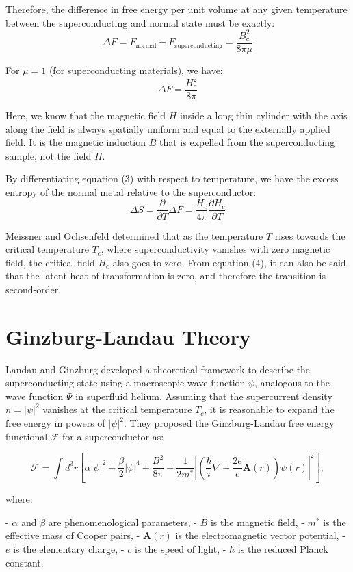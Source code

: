 \documentclass{article}
\begin{document}
Therefore, the difference in free energy per unit volume at any given temperature between the superconducting and normal state must be exactly:
\[
\Delta F = F_{\text{normal}} - F_{\text{superconducting}} = \frac{B_c^2}{8 \pi \mu}
\]

For \(\mu = 1\) (for superconducting materials), we have:
\[
\Delta F = \frac{H_c^2}{8 \pi} \tag{17}
\]

Here, we know that the magnetic field \(H\) inside a long thin cylinder with the axis along the field is always spatially uniform and equal to the externally applied field. It is the magnetic induction \(B\) that is expelled from the superconducting sample, not the field \(H\).

By differentiating equation (3) with respect to temperature, we have the excess entropy of the normal metal relative to the superconductor:
\[
\Delta S = \frac{\partial}{\partial T} \Delta F = \frac{H_c}{4 \pi} \frac{\partial H_c}{\partial T} \tag{18}
\]

Meissner and Ochsenfeld determined that as the temperature \(T\) rises towards the critical temperature \(T_c\), where superconductivity vanishes with zero magnetic field, the critical field \(H_c\) also goes to zero. From equation (4), it can also be said that the latent heat of transformation is zero, and therefore the transition is second-order.

\section{Ginzburg-Landau Theory}

Landau and Ginzburg developed a theoretical framework to describe the superconducting state using a macroscopic wave function \(\psi\), analogous to the wave function \(\Psi\) in superfluid helium. Assuming that the supercurrent density \(n = |\psi|^2\) vanishes at the critical temperature \(T_c\), it is reasonable to expand the free energy in powers of \(|\psi|^2\). They proposed the Ginzburg-Landau free energy functional \(\mathcal{F}\) for a superconductor as:

\[
\mathcal{F} = \int d^3r \left[ \alpha |\psi|^2 + \frac{\beta}{2} |\psi|^4 + \frac{B^2}{8\pi} + \frac{1}{2m^*} \left| \left( \frac{\hbar}{i} \nabla + \frac{2e}{c} \mathbf{A}(r) \right) \psi(r) \right|^2 \right],
\]

where:

- \(\alpha\) and \(\beta\) are phenomenological parameters,
- \(B\) is the magnetic field,
- \(m^*\) is the effective mass of Cooper pairs,
- \(\mathbf{A}(r)\) is the electromagnetic vector potential,
- \(e\) is the elementary charge,
- \(c\) is the speed of light,
- \(\hbar\) is the reduced Planck constant.
\end{document}
